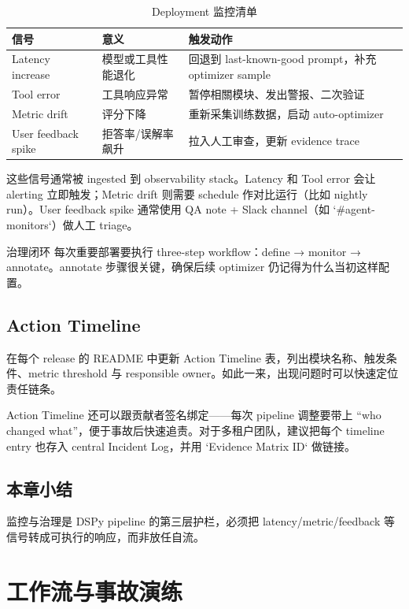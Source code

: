 \documentclass[a4paper]{article}
\begin{document}
\begin{table}[H]
\centering
\caption{Deployment 监控清单}
\begin{tabular}{p{}p{}p{}}
\toprule
信号 & 意义 & 触发动作 \\
\midrule
Latency increase & 模型或工具性能退化 & 回退到 last-known-good prompt，补充 optimizer sample \\
Tool error & 工具响应异常 & 暂停相關模块、发出警报、二次验证 \\
Metric drift & 评分下降 & 重新采集训练数据，启动 auto-optimizer \\
User feedback spike & 拒答率/误解率飙升 & 拉入人工审查，更新 evidence trace \\
\bottomrule
\end{tabular}
\end{table}

这些信号通常被 ingested 到 observability stack。Latency 和 Tool error 会让 alerting 立即触发；Metric drift 则需要 schedule 作对比运行（比如 nightly run）。User feedback spike 通常使用 QA note + Slack channel（如 `\#agent-monitors`）做人工 triage。

\begin{warningbox}{治理闭环}
每次重要部署要执行 three-step workflow：define → monitor → annotate。annotate 步骤很关键，确保后续 optimizer 仍记得为什么当初这样配置。
\end{warningbox}

\subsection{Action Timeline}

在每个 release 的 README 中更新 Action Timeline 表，列出模块名称、触发条件、metric threshold 与 responsible owner。如此一来，出现问题时可以快速定位责任链条。

Action Timeline 还可以跟贡献者签名绑定——每次 pipeline 调整要带上 ``who changed what''，便于事故后快速追责。对于多租户团队，建议把每个 timeline entry 也存入 central Incident Log，并用 `Evidence Matrix ID` 做链接。

\subsection{本章小结}

监控与治理是 DSPy pipeline 的第三层护栏，必须把 latency/metric/feedback 等信号转成可执行的响应，而非放任自流。

\section{工作流与事故演练}
\end{document}
